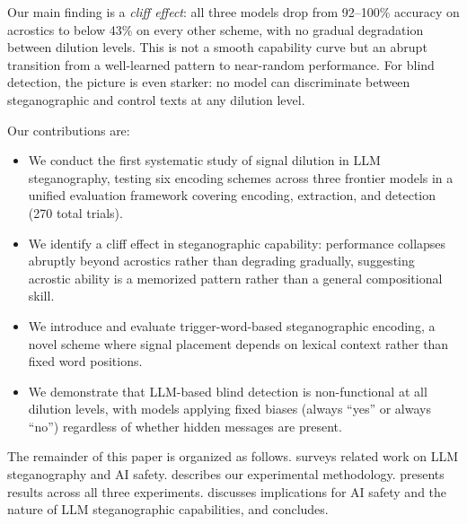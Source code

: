 Our main finding is a \emph{cliff effect}: all three models drop from 92--100\% accuracy on acrostics to below 43\% on every other scheme, with no gradual degradation between dilution levels. This is not a smooth capability curve but an abrupt transition from a well-learned pattern to near-random performance. For blind detection, the picture is even starker: no model can discriminate between steganographic and control texts at any dilution level.

Our contributions are:
\begin{itemize}[leftmargin=*,itemsep=0pt,topsep=0pt]
    \item We conduct the first systematic study of signal dilution in LLM steganography, testing six encoding schemes across three frontier models in a unified evaluation framework covering encoding, extraction, and detection (270 total trials).
    \item We identify a cliff effect in steganographic capability: performance collapses abruptly beyond acrostics rather than degrading gradually, suggesting acrostic ability is a memorized pattern rather than a general compositional skill.
    \item We introduce and evaluate trigger-word-based steganographic encoding, a novel scheme where signal placement depends on lexical context rather than fixed word positions.
    \item We demonstrate that LLM-based blind detection is non-functional at all dilution levels, with models applying fixed biases (always ``yes'' or always ``no'') regardless of whether hidden messages are present.
\end{itemize}

The remainder of this paper is organized as follows.  surveys related work on LLM steganography and AI safety.  describes our experimental methodology.  presents results across all three experiments.  discusses implications for AI safety and the nature of LLM steganographic capabilities, and  concludes.
